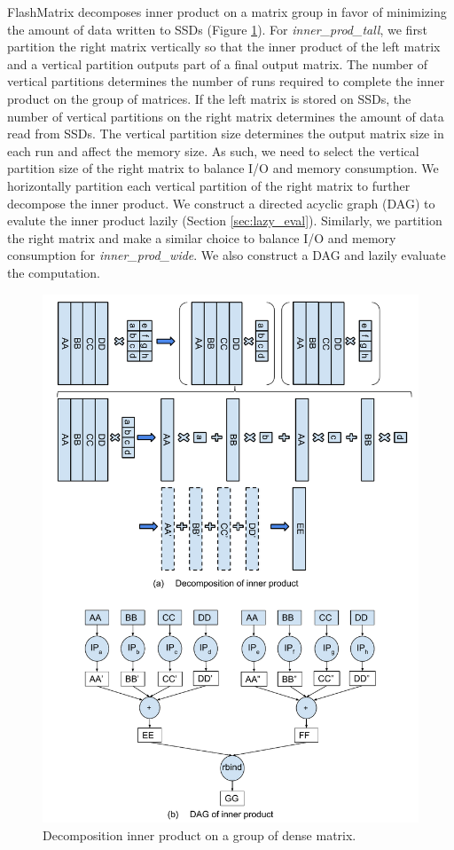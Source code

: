 FlashMatrix decomposes inner product on a matrix group in favor of minimizing
the amount of data written to SSDs (Figure \ref{fig:inner_prod}).
For \textit{inner\_prod\_tall}, we first partition the right matrix vertically
so that the inner product of the left matrix and a vertical partition outputs
part of a final output matrix. The number of vertical partitions determines
the number of runs required to complete the inner product on the group of matrices.
If the left matrix is stored on SSDs, the number of vertical partitions on
the right matrix determines the amount of data read from SSDs. The vertical
partition size determines the output matrix size in each run and affect
the memory size. As such, we need to select the vertical partition size of
the right matrix to balance I/O and memory consumption. We horizontally partition
each vertical partition of the right matrix to further decompose the inner
product. We construct a directed acyclic graph (DAG) to evalute the inner
product lazily (Section \ref{sec:lazy_eval}). Similarly, we partition the right
matrix and make a similar choice to balance I/O and memory consumption for
\textit{inner\_prod\_wide}. We also construct a DAG and lazily evaluate
the computation.

\begin{figure}
\centering
\includegraphics[scale=0.4]{FlashMatrix_figs/inner_prod_tall.pdf}
\vspace{-5pt}
\caption{Decomposition inner product on a group of dense matrix.}
\vspace{-5pt}
\label{fig:inner_prod}
\end{figure}

